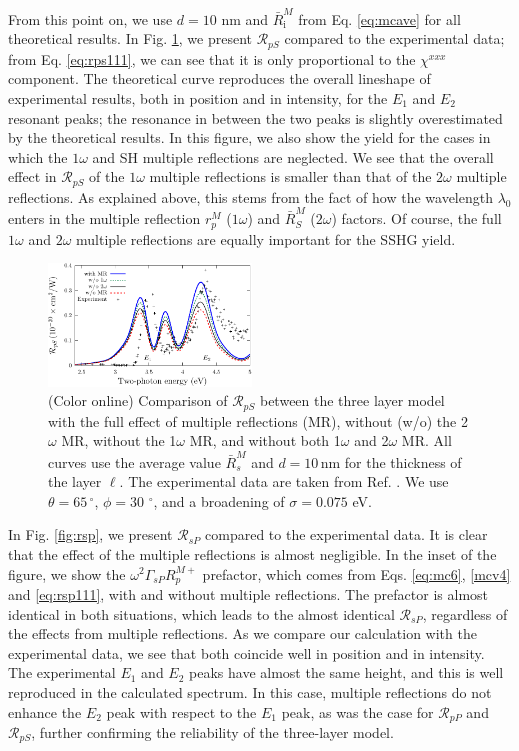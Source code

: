 \documentclass[aps,prb,10pt,showpacs,letterpaper,twocolumn]{revtex4-1}
\begin{document}
From this point on, we use $d=10$ nm and $\bar{R}^{M}_{\mathrm{i}}$ from Eq.
\eqref{eq:mcave} for all theoretical results. In Fig. \ref{fig:rps}, we present
$\mathcal{R}_{pS}$ compared to the experimental data; from Eq.
\eqref{eq:rps111}, we can see that it is only proportional to the $\chi^{xxx}$
component. The theoretical curve reproduces the overall lineshape of
experimental results, both in position and in intensity, for the $E_1$ and $E_2$
resonant peaks; the resonance in between the two peaks is slightly overestimated
by the theoretical results. In this figure, we also show the yield for the cases
in which the $1\omega$ and SH multiple reflections are neglected. We see that
the overall effect in $\mathcal{R}_{pS}$ of the $1\omega$ multiple reflections
is smaller than that of the $2\omega$ multiple reflections. As explained above,
this stems from the fact of how the wavelength $\lambda_{0}$ enters in the
multiple reflection $r^{M}_p$ ($1\omega$) and $\bar{R}^{M}_S$ ($2\omega$)
factors. Of course, the full $1\omega$ and $2\omega$ multiple reflections are
equally important for the SSHG yield.

\begin{figure}[t]
\includegraphics[width=0.48\textwidth]{fig4}
\caption{(Color online) Comparison of ${\mathcal R}_{pS}$ between the three
layer model with the full effect of multiple reflections (MR), without (w/o) the
2$\omega$ MR, without the 1$\omega$ MR, and without both 1$\omega$ and 2$\omega$
MR. All curves use the average value $\bar{R}^{M}_{s}$ and $d = 10\,\mathrm{nm}$
for the thickness of the layer $\ell$. The experimental data are taken from Ref.
. We use $\theta = 65\,^{\circ}$, $\phi =
30\,\,^{\circ}$, and a broadening of $\sigma = 0.075$ eV.}
\label{fig:rps}
\end{figure}

In Fig. \ref{fig:rsp}, we present $\mathcal{R}_{sP}$ compared to the
experimental data. It is clear that the effect of the multiple reflections is
almost negligible. In the inset of the figure, we show the
$\omega^{2}\Gamma_{sP}R^{M+}_{p}$ prefactor, which comes from Eqs.
\eqref{eq:mc6}, \eqref{mcv4} and \eqref{eq:rsp111}, with and without multiple
reflections. The prefactor is almost identical in both situations, which leads
to the almost identical ${\mathcal R}_{sP}$, regardless of the effects from
multiple reflections. As we compare our calculation with the experimental data,
we see that both coincide well in position and in intensity. The experimental
$E_{1}$ and $E_{2}$ peaks have almost the same height, and this is well
reproduced in the calculated spectrum. In this case, multiple reflections do not
enhance the $E_{2}$ peak with respect to the $E_{1}$ peak, as was the case for
$\mathcal{R}_{pP}$ and $\mathcal{R}_{pS}$, further confirming the reliability of
the three-layer model.
\end{document}
